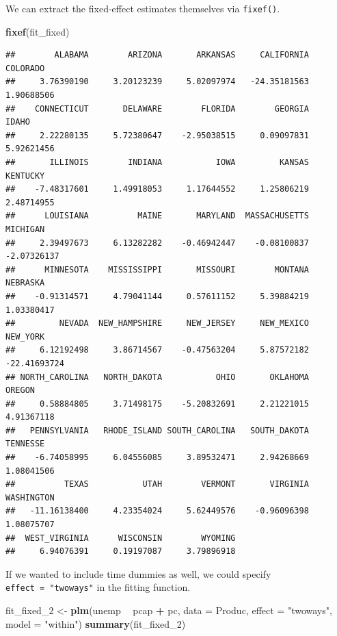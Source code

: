 \documentclass[12pt,oneside,openany]{book}
\newenvironment{Shaded}{\begin{snugshade}}{\end{snugshade}}
\newcommand{\KeywordTok}[1]{\textcolor[rgb]{0.13,0.29,0.53}{\textbf{#1}}}
\newcommand{\DataTypeTok}[1]{\textcolor[rgb]{0.13,0.29,0.53}{#1}}
\newcommand{\DecValTok}[1]{\textcolor[rgb]{0.00,0.00,0.81}{#1}}
\newcommand{\StringTok}[1]{\textcolor[rgb]{0.31,0.60,0.02}{#1}}
\newcommand{\OperatorTok}[1]{\textcolor[rgb]{0.81,0.36,0.00}{\textbf{#1}}}
\newcommand{\NormalTok}[1]{#1}
\begin{document}
We can extract the fixed-effect estimates themselves via
\texttt{fixef()}.

\begin{Shaded}
\begin{Highlighting}[]
\KeywordTok{fixef}\NormalTok{(fit_fixed)}
\end{Highlighting}
\end{Shaded}

\begin{verbatim}
##        ALABAMA        ARIZONA       ARKANSAS     CALIFORNIA       COLORADO 
##     3.76390190     3.20123239     5.02097974   -24.35181563     1.90688506 
##    CONNECTICUT       DELAWARE        FLORIDA        GEORGIA          IDAHO 
##     2.22280135     5.72380647    -2.95038515     0.09097831     5.92621456 
##       ILLINOIS        INDIANA           IOWA         KANSAS       KENTUCKY 
##    -7.48317601     1.49918053     1.17644552     1.25806219     2.48714955 
##      LOUISIANA          MAINE       MARYLAND  MASSACHUSETTS       MICHIGAN 
##     2.39497673     6.13282282    -0.46942447    -0.08100837    -2.07326137 
##      MINNESOTA    MISSISSIPPI       MISSOURI        MONTANA       NEBRASKA 
##    -0.91314571     4.79041144     0.57611152     5.39884219     1.03380417 
##         NEVADA  NEW_HAMPSHIRE     NEW_JERSEY     NEW_MEXICO       NEW_YORK 
##     6.12192498     3.86714567    -0.47563204     5.87572182   -22.41693724 
## NORTH_CAROLINA   NORTH_DAKOTA           OHIO       OKLAHOMA         OREGON 
##     0.58884805     3.71498175    -5.20832691     2.21221015     4.91367118 
##   PENNSYLVANIA   RHODE_ISLAND SOUTH_CAROLINA   SOUTH_DAKOTA       TENNESSE 
##    -6.74058995     6.04556085     3.89532471     2.94268669     1.08041506 
##          TEXAS           UTAH        VERMONT       VIRGINIA     WASHINGTON 
##   -11.16138400     4.23354024     5.62449576    -0.96096398     1.08075707 
##  WEST_VIRGINIA      WISCONSIN        WYOMING 
##     6.94076391     0.19197087     3.79896918
\end{verbatim}

If we wanted to include time dummies as well, we could specify
\texttt{effect\ =\ "twoways"} in the fitting function.

\begin{Shaded}
\begin{Highlighting}[]
\NormalTok{fit_fixed_}\DecValTok{2}\NormalTok{ <-}\StringTok{ }\KeywordTok{plm}\NormalTok{(unemp }\OperatorTok{~}\StringTok{ }\NormalTok{pcap }\OperatorTok{+}\StringTok{ }\NormalTok{pc,}
                   \DataTypeTok{data =}\NormalTok{ Produc,}
                   \DataTypeTok{effect =} \StringTok{"twoways"}\NormalTok{,}
                   \DataTypeTok{model =} \StringTok{"within"}\NormalTok{)}
\KeywordTok{summary}\NormalTok{(fit_fixed_}\DecValTok{2}\NormalTok{)}
\end{Highlighting}
\end{Shaded}
\end{document}
